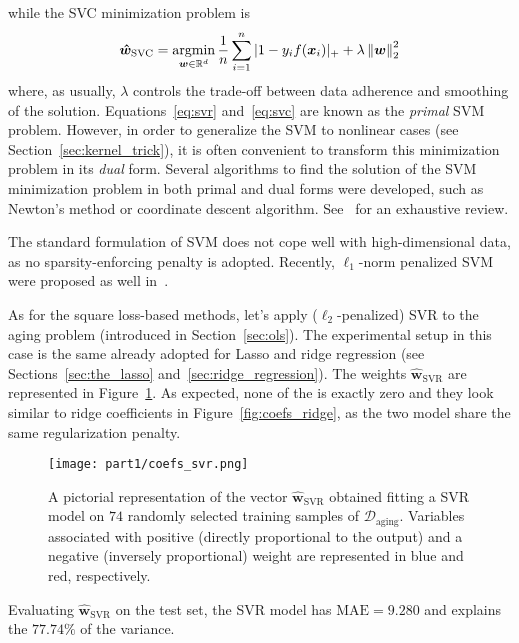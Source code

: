 			while the SVC minimization problem is
			\begin{equation} \label{eq:svc}
				\bm{\hat w}_{\text{SVC}} = \mathop{\mathrm{argmin}}\limits_{\bm{w} \in \mathbb{R}^d} \frac{1}{n} \sum_{i=1}^n |1 - y_if(\bm{x}_i)|_+ + \lambda \left\lVert\bm{w}\right\rVert_2^2
			\end{equation}
			where, as usually, $\lambda$ controls the trade-off between data adherence and smoothing of the solution.
			Equations~\eqref{eq:svr} and~\eqref{eq:svc} are known as the \textit{primal} SVM problem. However, in order to generalize the SVM to nonlinear cases (see Section~\ref{sec:kernel_trick}), it is often convenient to transform this minimization problem in its \textit{dual} form. Several algorithms to find the solution of the SVM minimization problem in both primal and dual forms were developed, such as Newton's method or coordinate descent algorithm. See~\cite{smola2004tutorial, shawe2011review} for an exhaustive review.

			The standard formulation of SVM does not cope well with high-dimensional data, as no sparsity-enforcing penalty is adopted. Recently, $\ell_1$-norm penalized SVM were proposed as well in~\cite{zhu20041, peng2016error}.

			As for the square loss-based methods, let's apply ($\ell_2$-penalized) SVR to the aging problem (introduced in Section~\ref{sec:ols}).
			The experimental setup in this case is the same already adopted for Lasso and ridge regression (see Sections~\ref{sec:the_lasso} and~\ref{sec:ridge_regression}).
			The weights $\bm{\hat w}_{\text{SVR}}$ are represented in Figure~\ref{fig:coefs_svr}. As expected, none of the is exactly zero and they look similar to ridge coefficients in Figure~\ref{fig:coefs_ridge}, as the two model share the same regularization penalty.
			\begin{figure}[!h]
				\centering
				\texttt{[image: part1/coefs\_svr.png]}
				\caption{A pictorial representation of the vector $\bm{\hat w}_{\text{SVR}}$ obtained fitting a SVR model on $74$ randomly selected training samples of $\mathcal{D}_{\text{aging}}$. Variables associated with positive (\ie directly proportional to the output) and a negative (\ie inversely proportional) weight are represented in blue and red, respectively.} \label{fig:coefs_svr}
			\end{figure}
			Evaluating $\bm{\hat w}_{\text{SVR}}$ on the test set, the SVR model has $\text{MAE}=9.280$ and explains the $77.74\%$ of the variance.


